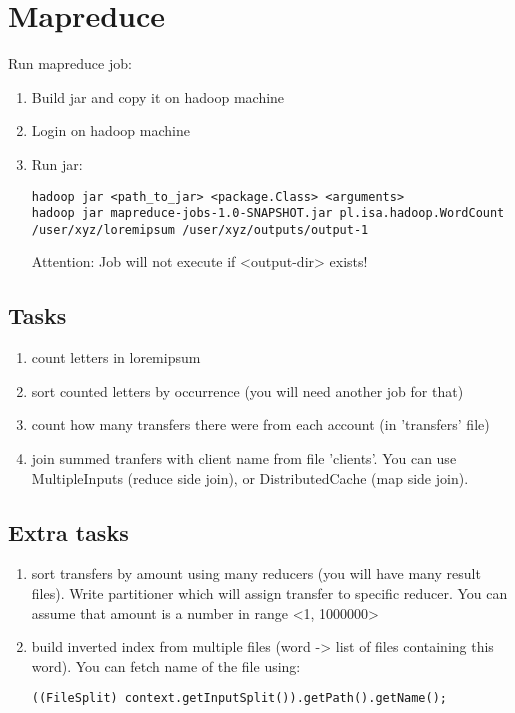 \documentclass{article}
\begin{document}
\section*{Mapreduce}

Run mapreduce job:
\begin{enumerate}
\item Build jar and copy it on hadoop machine
\item Login on hadoop machine
\item Run jar:
\begin{lstlisting}
hadoop jar <path_to_jar> <package.Class> <arguments>
hadoop jar mapreduce-jobs-1.0-SNAPSHOT.jar pl.isa.hadoop.WordCount /user/xyz/loremipsum /user/xyz/outputs/output-1
\end{lstlisting}

Attention: Job will not execute if <output-dir> exists!
\end{enumerate}

\subsection*{Tasks}

\begin{enumerate}
\item count letters in loremipsum
\item sort counted letters by occurrence (you will need another job for that)
\item count how many transfers there were from each account (in 'transfers' file)
\item join summed tranfers with client name from file 'clients'. You can use MultipleInputs (reduce side join), or DistributedCache (map side join).
\end{enumerate}

\subsection*{Extra tasks}

\begin{enumerate}
\item sort transfers by amount using many reducers (you will have many result files). Write partitioner which will assign transfer to specific reducer. You can assume that amount is a number in range <1, 1000000>
\item build inverted index from multiple files (word -> list of files containing this word). You can fetch name of the file using:
\begin{lstlisting}
((FileSplit) context.getInputSplit()).getPath().getName();
\end{lstlisting}
\end{enumerate}
\end{document}
